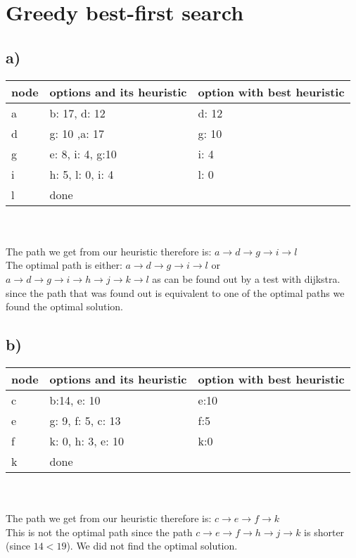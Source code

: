 \documentclass[12pt,a4paper]{scrartcl}
\begin{document}
	
\section{Greedy best-first search}
\subsection*{a)}
	\begin{tabular}{l | l | l   }
		node & options and its heuristic & option with best heuristic \\ \hline
		a & b: 17, d: 12 & d: 12 \\
		d & g: 10 ,a: 17 & g: 10 \\
		g & e: 8, i: 4, g:10& i: 4 \\
		i & h: 5, l: 0, i: 4 & l: 0 \\
		l & done & 
	\end{tabular}\\ \\
	The path we get from our heuristic therefore is: $a \rightarrow d \rightarrow g \rightarrow i \rightarrow l$\\
	The optimal path is either: $a \rightarrow d \rightarrow g \rightarrow i \rightarrow l$ or $a \rightarrow d \rightarrow g \rightarrow i \rightarrow h \rightarrow j \rightarrow k \rightarrow l$ as can be found out by a test with dijkstra. \\
	since the path that was found out is equivalent to one of the optimal paths we found the optimal solution. 
\subsection*{b)}
	\begin{tabular}{l | l | l   }
		node & options and its heuristic & option with best heuristic \\ \hline
		c & b:14, e: 10 & e:10 \\
		e & g: 9, f: 5, c: 13 & f:5 \\
		f & k: 0, h: 3, e: 10 & k:0 \\
		k & done 		
	\end{tabular}\\ \\
	The path we get from our heuristic therefore is: $c \rightarrow e \rightarrow f \rightarrow k$\\
	This is not the optimal path since the path $c \rightarrow e \rightarrow f \rightarrow h \rightarrow j \rightarrow k$ is shorter (since $14 < 19$). We did not find the optimal solution.
\end{document}
